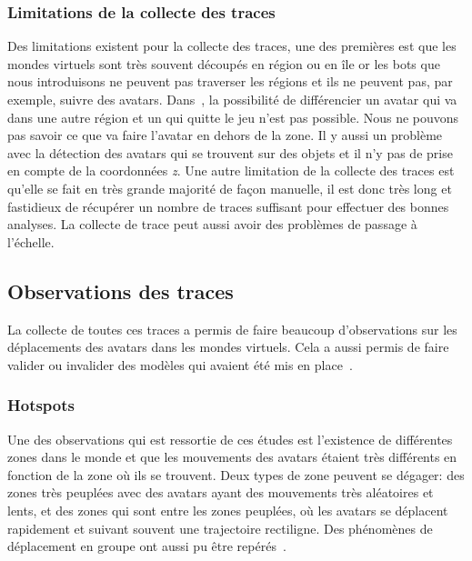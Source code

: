  		\subsubsection{Limitations de la collecte des traces}
	Des limitations existent pour la collecte des traces, une des premières est que les mondes virtuels sont très souvent découpés en région ou en île or les bots que nous introduisons ne peuvent pas traverser les régions et ils ne peuvent pas, par exemple, suivre des avatars. Dans~\cite{DBLP:journals/corr/abs-0807-2328}, la possibilité de différencier un avatar qui va dans une autre région et un qui quitte le jeu n'est pas possible. Nous ne pouvons pas savoir ce que va faire l'avatar en dehors de la zone. Il y aussi un problème avec la détection des avatars qui se trouvent sur des objets et il n'y pas de prise en compte de la coordonnées \textit{z}. Une autre limitation de la collecte des traces est qu'elle se fait en très grande majorité de façon manuelle, il est donc très long et fastidieux de récupérer un nombre de traces suffisant pour effectuer des bonnes analyses. La collecte de trace peut aussi avoir des problèmes de passage à l'échelle.

	\subsection{Observations des traces}
	 La collecte de toutes ces traces a permis de faire beaucoup d'observations sur les déplacements des avatars dans les mondes virtuels. Cela a aussi permis de faire valider ou invalider des modèles qui avaient été mis en place~\cite{DBLP:journals/corr/abs-0807-2328}. 
		\subsubsection{Hotspots}
	Une des observations qui est ressortie de ces études est l'existence de différentes zones dans le monde et que les mouvements des avatars étaient très différents en fonction de la zone où ils se trouvent. Deux types de zone peuvent se dégager: des zones très peuplées avec des avatars ayant des mouvements très aléatoires et lents, et des zones qui sont entre les zones peuplées, où les avatars se déplacent rapidement et suivant souvent une trajectoire rectiligne. Des phénomènes de déplacement en groupe ont aussi pu être repérés~\cite{15141312}. \\
